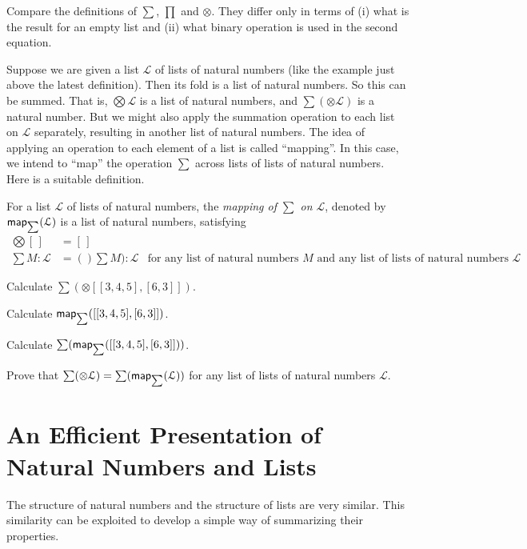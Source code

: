 Compare the definitions of $\sum$, $\prod$ and $\otimes$. They differ only in terms of (i) what is the result for an empty list
and (ii) what binary operation is used in the second equation.

Suppose we are given a list $\mathcal L$ of lists of natural numbers (like the example just above the latest definition). Then its fold is a list of natural numbers. So this can be summed. That is, $\bigotimes \mathcal L$ is a list of natural numbers, and $\sum(\otimes \mathcal L)$ is a natural number. But we might also apply the summation operation to each list on $\mathcal L$ separately, resulting in another list of natural numbers.
The idea of applying an operation to each element of a list is called ``mapping''. In this case, we intend to ``map'' the operation $\sum$
across lists of lists of natural numbers. Here is a suitable definition.

\begin{defn}
	For a list $\mathcal L$ of lists of natural numbers, the \emph{mapping of $\sum$
		 on $\mathcal L$}, denoted by $\mathord{\textsf{map}}_{\sum}(\mathcal L)$
	is a list of natural numbers, satisfying
	\begin{align*}
	\bigotimes[\,] &= [\,]\\
	\sum M:\mathcal L &= ()\sum M): \mathcal L &\text{for any list of natural numbers $M$ and any list of lists of natural numbers $\mathcal L$}
	\end{align*}
\end{defn}

\begin{exercises}
	\item Calculate $\sum(\otimes[[3,4,5],[6,3]])$.
	\item Calculate $\mathord{\textsf{map}}_{\sum}([[3,4,5],[6,3]])$.
	\item Calculate $\sum(\mathord{\textsf{map}}_{\sum}([[3,4,5],[6,3]]))$.
	\item Prove that $\sum(\otimes\mathcal L) = \sum(\mathord{\textsf{map}}_{\sum}(\mathcal L))$ for any list of lists of natural numbers $\mathcal L$.
\end{exercises}

\section{An Efficient Presentation of Natural Numbers and Lists}

The structure of natural numbers and the structure of lists are very similar. This similarity can be exploited to 
develop a simple way of summarizing their properties.

